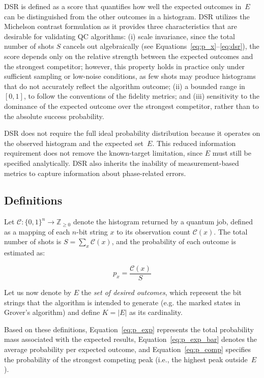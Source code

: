 \documentclass[10pt,conference]{IEEEtran}
\begin{document}
DSR is defined as a score that quantifies how well the expected outcomes in~$E$ can be distinguished from the other outcomes in a histogram. DSR utilizes the Michelson contrast formulation \cite{michelsonInterferenceMethods_1890, michelsonStudiesOptics_1927} as it provides three characteristics that are desirable for validating QC algorithms: (i) scale invariance, since the total number of shots $S$ cancels out algebraically (see Equations~\eqref{eq:p_x}--\eqref{eq:dsr}), the score depends only on the relative strength between the expected outcomes and the strongest competitor; however, this property holds in practice only under sufficient sampling or low-noise conditions, as few shots may produce histograms that do not accurately reflect the algorithm outcome; (ii) a bounded range in $[0, 1]$, to follow the conventions of the fidelity metrics; and (iii) sensitivity to the dominance of the expected outcome over the strongest competitor, rather than to the absolute success probability.

DSR does not require the full ideal probability distribution because it operates on the observed histogram and the expected set~$E$. This reduced information requirement does not remove the known-target limitation, since $E$ must still be specified analytically. DSR also inherits the inability of measurement-based metrics to capture information about phase-related errors.

\subsection{Definitions}

Let $\mathcal{C} : \{0,1\}^n \to \mathbb{Z}_{\geq 0}$ denote the histogram returned by a quantum job, defined as a mapping of each $n$-bit string $x$ to its observation count $\mathcal{C}(x)$. The total number of shots is $S = \sum_{x} \mathcal{C}(x)$, and the probability of each outcome is estimated as:

\begin{equation}
\label{eq:p_x}
    p_{x} = \frac{\mathcal{C}(x)}{S}
\end{equation}

Let us now denote by $E$ the \emph{set of desired outcomes}, which represent the bit strings that the algorithm is intended to generate (e.g. the marked states in Grover’s algorithm) and define $K = |E|$ as its cardinality.

Based on these definitions, Equation~\eqref{eq:p_exp} represents the total probability mass associated with the expected results, Equation~\eqref{eq:p_exp_bar} denotes the average probability per expected outcome, and Equation~\eqref{eq:p_comp} specifies the probability of the strongest competing peak (i.e., the highest peak outside~$E$).
\end{document}
